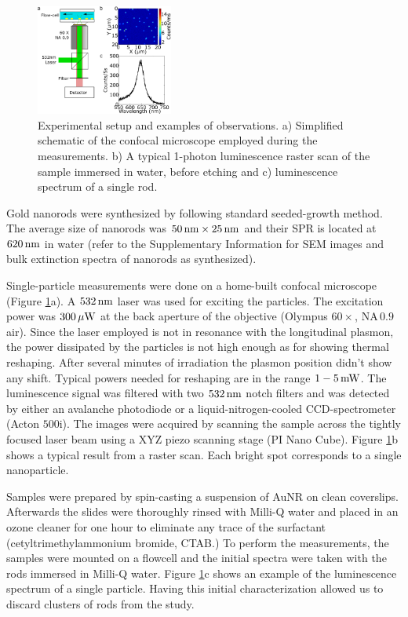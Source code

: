\begin{figure}[htp]
 \centering
 \includegraphics[width=0.40\textwidth]{Chapters/02_KCN/Figures/01_Setup/setup_1.png}
 \caption{Experimental setup and examples of observations. a) Simplified
 schematic of the confocal microscope employed during the measurements. b) A
 typical 1-photon luminescence raster scan of the sample immersed in
 water, before etching and c) luminescence spectrum of a single rod.}
 \label{fig:setup}
\end{figure}

Gold nanorods were synthesized by following standard seeded-growth
method\cite{Nikoobakht2003}. The average size of nanorods was $50\,\textrm{nm}\times
25\,\textrm{nm}$ and their SPR is located at $620\,\textrm{nm}$ in water (refer to the
Supplementary Information for SEM images and bulk extinction spectra of nanorods
as synthesized).

Single-particle measurements were done on a home-built confocal microscope
(Figure \ref{fig:setup}a). A $532\,\textrm{nm}$ laser was used for exciting the particles.
The excitation power was $300\,\mu\textrm{W}$ at the back aperture of the objective (Olympus
$60\times$, $\textrm{NA}\,0.9$ air). Since the laser employed is not in
resonance with the longitudinal plasmon, the power dissipated by the particles
is not high enough as for showing thermal reshaping. After several minutes of
irradiation the plasmon position didn't show any shift. Typical powers needed
for reshaping are in the range $1-5\,\textrm{mW}$\cite{Yorulmaz2012}. The luminescence
signal was filtered with two $532\,\textrm{nm}$ notch filters and was detected by either
an avalanche photodiode or a liquid-nitrogen-cooled CCD-spectrometer (Acton
$500\textrm{i}$). The images were acquired by scanning the sample across the
tightly focused laser beam using a XYZ piezo scanning stage (PI Nano Cube).
Figure \ref{fig:setup}b shows a typical result from a raster scan. Each bright
spot corresponds to a single nanoparticle.

Samples were prepared by spin-casting a suspension of AuNR on clean coverslips.
Afterwards the slides were thoroughly rinsed with Milli-Q water and placed in an
ozone cleaner for one hour to eliminate any trace of the surfactant
(cetyltrimethylammonium bromide, CTAB.) To perform the measurements, the samples
were mounted on a flowcell and the initial spectra were taken with the rods
immersed in Milli-Q water. Figure \ref{fig:setup}c shows an example of the
luminescence spectrum of a single particle. Having this initial characterization
allowed us to discard clusters of rods\cite{Funston2009} from the study. 

